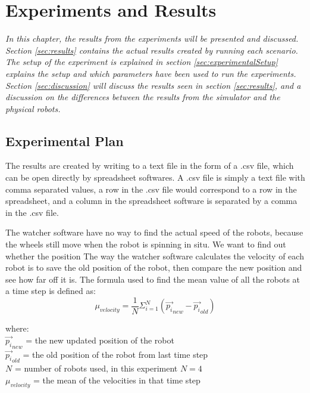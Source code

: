 \chapter{Experiments and Results}
\label{cha:ResearchAndResults}

{\it In this chapter, the results from the experiments will be presented and discussed. Section \ref{sec:results} contains the actual results created by running each scenario. The setup of the experiment is explained in section \ref{sec:experimentalSetup} explains the setup and which parameters have been used to run the experiments.
Section \ref{sec:discussion} will discuss the results seen in section \ref{sec:results}, and a discussion on the differences between the results from the simulator and the physical robots.}

\section{Experimental Plan}
\label{sec:experimentalPlan}

The results are created by writing to a text file in the form of a .csv file, which can be open directly by spreadsheet softwares. A .csv file is simply a text file with comma separated values, a row in the .csv file would correspond to a row in the spreadsheet, and a column in the spreadsheet software is separated by a comma in the .csv file.

The watcher software have no way to find the actual speed of the robots, because the wheels still move when the robot is spinning in situ. 
We want to find out whether the position 
The way the watcher software calculates the velocity of each robot is to save the old position of the robot, then compare the new position and see how far off it is.
The formula used to find the mean value of all the robots at a time step is defined as:
\begin{equation}
\mu_{velocity} = \frac{1}{N} \Sigma_{i=1}^N (\vec{p_i}_{new} - \vec{p_i}_{old})
\end{equation}

where:
\\
$\vec{p_i}_{new}$ = the new updated position of the robot
\\
$\vec{p_i}_{old}$ = the old position of the robot from last time step
\\
$N$ = number of robots used, in this experiment $N =  4$ 
\\
$\mu_{velocity}$ = the mean of the velocities in that time step

